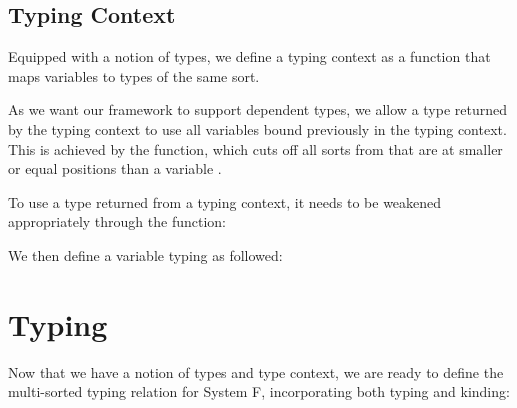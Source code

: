\documentclass[a4paper, UKenglish, cleveref, autoref, thm-restate]{lipics-v2021}
\newenvironment{LibCode*}{%
  \begin{tcolorbox}[%
    colframe=white,%
    boxrule=0.0pt,%
    top=2.5pt,%
    left=2.5pt,%
    bottom=2.5pt,%
    right=2.5pt,%
    before skip=5pt,%
    after skip=5pt,%
    boxsep=0pt%
  ]
}{%
  \end{tcolorbox}%
}
\newcommand*\LibCode[1]{\begin{LibCode*}{#1}\end{LibCode*}}
\newcommand*\AppCode[1]{{#1}}
\newcommand*\ACode[1]{\AgdaFontStyle{\textcolor{mygray}{#1}}}
\newcommand*\ADef[1]{\AgdaFunction{#1}}
\begin{document}
  \subsection{Typing Context}
  Equipped with a notion of types, we define a typing context as a
  function that maps variables to types of the same sort.

  As we want our framework to support dependent types, we allow a type returned
  by the typing context to use all variables bound previously in the typing context.
  This is achieved by the \ACode{drop-∈} function, which cuts off all
  sorts from \ACode{S} that are at smaller or equal positions than a variable \ACode{x}.

  \noindent
  \begin{minipage}{1.0\linewidth}
    \begin{minipage}{0.5\linewidth}
      \LibCode\KContexts
      \vspace{3mm}
    \end{minipage}
    \begin{minipage}{0.5\linewidth}
      \LibCode\KContextExt
    \end{minipage}
  \end{minipage}

  To use a type returned from a typing context, it needs to be
  weakened appropriately through the \ACode{\ADef{wk-telescope}} function:

  \noindent
  \begin{minipage}[t]{1.0\linewidth}
    \begin{minipage}[t]{0.45\linewidth}
      \LibCode\KContextLookupII
    \end{minipage}
    \begin{minipage}[t]{0.55\linewidth}
      \LibCode\KContextLookupI
    \end{minipage}
  \end{minipage}

  We then define a variable typing as followed:
  \LibCode\KVariableTyping

  \section{Typing}
  \label{sec:typing}
  Now that we have a notion of types and type context, we are ready to define
  the multi-sorted typing relation for System F, incorporating both
  typing and kinding:
  \AppCode\FTyping

\end{document}
